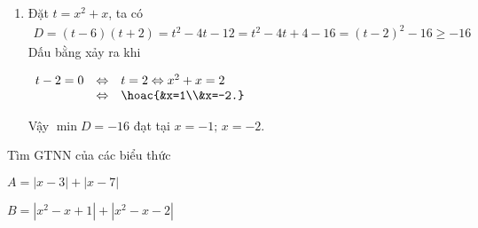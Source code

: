 \begin{bt}
{\begin{enumerate}
{\begin{eqnarray*}
					&\Rightarrow &C \geq \left(\dfrac{3}{4}\right)^2=\dfrac{9}{16}.
			\end{eqnarray*}}
			Dấu bằng xảy ra khi $x-\dfrac{1}{2}=0 \Leftrightarrow x=\dfrac{1}{2}$.\\
			Vậy $\min C=\dfrac{9}{16}$ đạt tại $x=\dfrac{1}{2}$.
			\item Đặt $t=x^2+x$, ta có
			\begin{align*}
				D=(t-6)(t+2)=t^2-4t-12=t^2-4t+4-16=(t-2)^2-16
				\geq -16
			\end{align*}
			Dấu bằng xảy ra khi 
			\begin{center}
				$\begin{array}{lll}
				t-2=0& \Leftrightarrow& t=2 \Leftrightarrow x^2+x=2 \\
				&\Leftrightarrow& \hoac{&x=1\\&x=-2.}
				\end{array}$
			\end{center}
			Vậy $\min D=-16$ đạt tại $x=-1;\,x=-2$.
		\end{enumerate}	
	}
\end{bt}
\begin{bt}%
	Tìm GTNN của các biểu thức
	\begin{listEX}[2]
		\item $A=|x-3|+|x-7|$
		\item $B=|x^2-x+1|+|x^2-x-2|$
	\end{listEX}
\end{bt}
